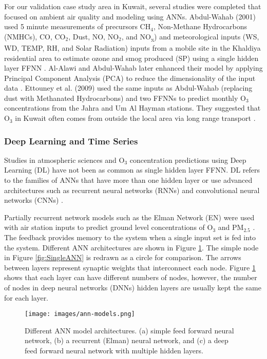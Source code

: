 For our validation case study area in Kuwait, several studies were completed that focused on ambient air quality and modeling using ANNs. Abdul-Wahab (2001) used 5 minute measurements of precursors CH$_{4}$, Non-Methane Hydrocarbons (NMHCs), CO, CO$_{2}$, Dust, NO, NO$_{2}$, and NO\textsubscript{x}) and meteorological inputs (WS, WD, TEMP, RH, and Solar Radiation) inputs from a mobile site in the Khaldiya residential area to estimate ozone and smog produced (SP)  using a single hidden layer FFNN \citep{AbdulWahab2001}. Al-Alawi and Abdul-Wahab later enhanced their model by applying Principal Component Analysis (PCA) to reduce the dimensionality of the input data \citep{AlAlawi2008}.  Ettouney et al. (2009) used the same inputs as Abdul-Wahab (replacing dust with Methanated Hydrocarbons) and two FFNNs to predict monthly O$_{3}$ concentrations from the Jahra and Um Al Hayman stations. They suggested that O$_{3}$ in Kuwait often comes from outside the local area via long range transport \citep{Ettouney2009a}. 


\subsubsection{Deep Learning and Time Series}
Studies in atmospheric sciences and O$_{3}$ concentration predictions using Deep Learning (DL) have not been as common as single hidden layer FFNN. DL refers to the families of ANNs that have more than one hidden layer or use advanced architectures such as recurrent neural networks (RNNs) and convolutional neural networks (CNNs) \citep{Goodfellow2016}. 

Partially recurrent network models such as the Elman Network (EN) were used  with air station inputs to predict ground level concentrations of O$_{3}$ \citep{Biancofiore2015} and PM$_{2.5}$ \citep{Biancofiore2017}. The feedback provides memory to the system when a single input set is fed into the system. Different ANN architectures are shown in Figure \ref{fig:ANNmodels}. The simple node in Figure \ref{fig:SingleANN} is redrawn as a circle for comparison.  The arrows between layers represent synaptic weights that interconnect each node. Figure \ref{fig:ANNmodels} shows that each layer can have different numbers of nodes, however, the number of nodes in deep neural networks (DNNs) hidden layers are usually kept the same for each layer.
%
\begin{figure}[H]
\centering
\texttt{[image: images/ann-models.png]} 
\caption[Different ANN model architectures.]{Different ANN model architectures. (a) simple feed forward neural network, (b) a recurrent (Elman) neural network, and (c) a deep feed forward neural network with multiple hidden layers.}
\label{fig:ANNmodels}
\end{figure}
%

